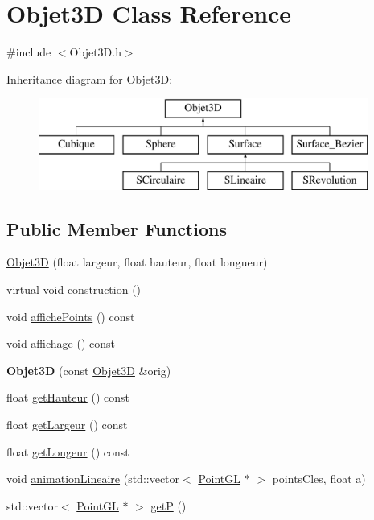 \hypertarget{classObjet3D}{\section{Objet3\-D Class Reference}
\label{classObjet3D}
}


{\ttfamily \#include $<$Objet3\-D.\-h$>$}

Inheritance diagram for Objet3\-D\-:\begin{figure}[H]
\begin{center}
\leavevmode
\includegraphics[height=3.000000cm]{classObjet3D}
\end{center}
\end{figure}
\subsection*{Public Member Functions}
\begin{DoxyCompactItemize}
\item 
\hyperlink{classObjet3D_aa378c3af15cbb46b010603f94c1d62f3}{Objet3\-D} (float largeur, float hauteur, float longueur)
\item 
virtual void \hyperlink{classObjet3D_adeb89dbb10335cd671378377818c1f71}{construction} ()
\item 
void \hyperlink{classObjet3D_ababe950dcc59f781b8140c327d64bdf6}{affiche\-Points} () const 
\item 
void \hyperlink{classObjet3D_a709f4a7ea16ecbf8628f41f0d701a211}{affichage} () const 
\item 
\hypertarget{classObjet3D_a1e0e07c88de765c1f303f65ab6c8d4c2}{{\bfseries Objet3\-D} (const \hyperlink{classObjet3D}{Objet3\-D} \&orig)}\label{classObjet3D_a1e0e07c88de765c1f303f65ab6c8d4c2}

\item 
float \hyperlink{classObjet3D_a0ea8e830e644ef96444969735679af66}{get\-Hauteur} () const 
\item 
float \hyperlink{classObjet3D_afaadd0060040977f410c5e0e724219c9}{get\-Largeur} () const 
\item 
float \hyperlink{classObjet3D_a8a364df4157ccde3eee4d544151a875b}{get\-Longeur} () const 
\item 
void \hyperlink{classObjet3D_ae8638f280f3627419c6777fe974011b2}{animation\-Lineaire} (std\-::vector$<$ \hyperlink{classPointGL}{Point\-G\-L} $\ast$ $>$ points\-Cles, float a)
\item 
std\-::vector$<$ \hyperlink{classPointGL}{Point\-G\-L} $\ast$ $>$ \hyperlink{classObjet3D_ad6212ed4caebf78e5a1764a2a3d76551}{get\-P} ()
\end{DoxyCompactItemize}
